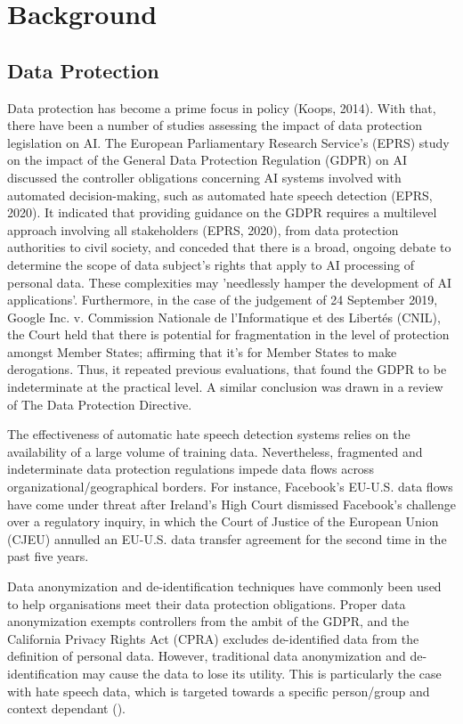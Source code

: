 \documentclass[letterpaper]{article} %
\begin{document}
\bigskip
\section{Background}
\subsection{Data Protection}
Data protection has become a prime focus in policy (Koops, 2014). With that, there have been a number of studies assessing the impact of data protection legislation on AI. The European Parliamentary Research Service's (EPRS) study on the impact of the General Data Protection Regulation (GDPR) on AI discussed the controller obligations concerning AI systems involved with automated decision-making, such as automated hate speech detection (EPRS, 2020). It indicated that providing guidance on the GDPR requires a multilevel approach involving all stakeholders (EPRS, 2020), from data protection authorities to civil society, and conceded that there is a broad, ongoing debate to determine the scope of data subject's rights that apply to AI processing of personal data. These complexities may 'needlessly hamper the development of AI applications'. Furthermore, in the case of the judgement of 24 September 2019, Google Inc. v. Commission Nationale de l’Informatique et des Libertés (CNIL), the Court held that there is potential for fragmentation in the level of protection amongst Member States; affirming that it's for Member States to make derogations. Thus, it repeated previous evaluations, that found the GDPR to be indeterminate at the practical level. A similar conclusion was drawn in a review of The Data Protection Directive.\par

The effectiveness of automatic hate speech detection systems relies on the availability of a large volume of training data. Nevertheless, fragmented and indeterminate data protection regulations impede data flows across organizational/geographical borders. For instance, Facebook’s EU-U.S. data flows have come under threat after Ireland’s High Court dismissed Facebook's challenge over a regulatory inquiry, in which the Court of Justice of the European Union (CJEU) annulled an EU-U.S. data transfer agreement for the second time in the past five years. \par

Data anonymization and de-identification techniques have commonly been used to help organisations meet their data protection obligations. Proper data anonymization exempts controllers from the ambit of the GDPR, and the California Privacy Rights Act (CPRA) excludes de-identified data from the definition of personal data. However, traditional data anonymization and de-identification may cause the data to lose its utility. This is particularly the case with hate speech data, which is targeted towards a specific person/group and context dependant ().
\end{document}
